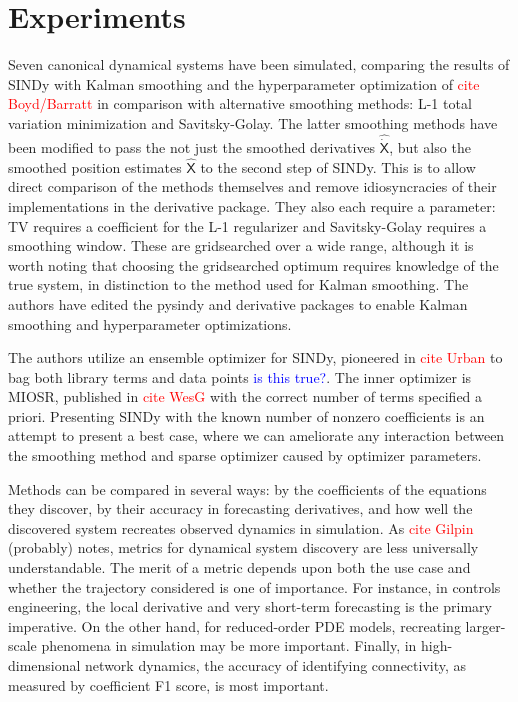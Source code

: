 \documentclass{article}
\newcommand{\red}[1]{\textcolor{red}{#1}}
\newcommand{\blue}[1]{\textcolor{blue}{#1}}
\newcommand{\mat}[1]{\boldsymbol{\mathsf{#1}}}
\begin{document}
\section{Experiments}

Seven canonical dynamical systems have been simulated, comparing the results of SINDy with Kalman smoothing and the hyperparameter optimization of \red{cite Boyd/Barratt} in comparison with alternative smoothing methods: L-1 total variation minimization and Savitsky-Golay.  The latter smoothing methods have been modified to pass the not just the smoothed derivatives $\mat{\widehat{\dot X}}$, but also the smoothed position estimates $\mat {\widehat X}$ to the second step of SINDy.  This is to allow direct comparison of the methods themselves and remove idiosyncracies of their implementations in the derivative package.  They also each require a parameter: TV requires a coefficient for the L-1 regularizer and Savitsky-Golay requires a smoothing window.  These are gridsearched over a wide range, although it is worth noting that choosing the gridsearched optimum requires knowledge of the true system, in distinction to the method used for Kalman smoothing.  The authors have edited the pysindy and derivative packages to enable Kalman smoothing and hyperparameter optimizations.

The authors utilize an ensemble optimizer for SINDy, pioneered in \red{cite Urban} to bag both library terms and data points \blue{is this true?}.  The inner optimizer is MIOSR, published in \red{cite WesG} with the correct number of terms specified a priori.  Presenting SINDy with the known number of nonzero coefficients is an attempt to present a best case, where we can ameliorate any interaction between the smoothing method and sparse optimizer caused by optimizer parameters.

Methods can be compared in several ways: by the coefficients of the equations they discover, by their accuracy in forecasting derivatives, and how well the discovered system recreates observed dynamics in simulation.  As \red{cite Gilpin} (probably) notes,  metrics for dynamical system discovery are less universally understandable.  The merit of a metric depends upon both the use case and whether the trajectory considered is one of importance.  For instance, in controls engineering, the local derivative and very short-term forecasting is the primary imperative.  On the other hand, for reduced-order PDE models, recreating larger-scale phenomena in simulation may be more important.  Finally, in high-dimensional network dynamics, the accuracy of identifying connectivity, as measured by coefficient F1 score, is most important.
\end{document}
